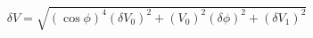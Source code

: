 \begin{equation}
\label{eq:delta_V_Malus}
\delta V = \sqrt{ \left(\cos{\phi}\right)^4(\delta V_0)^2 + \left(V_0\right)^2(\delta \phi)^2+ (\delta V_1)^2}
\end{equation}